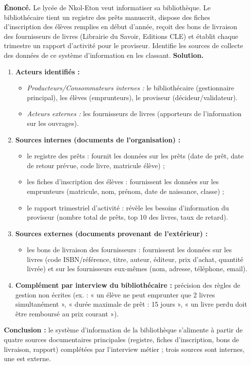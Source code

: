 \documentclass[11pt]{article}
\newcommand{\cle}[1]{{\popxbold\color{popdark}#1}}
\begin{document}
\begin{exoresolu}
\textbf{Énoncé.} Le lycée de Nkol-Eton veut informatiser sa bibliothèque. Le bibliothécaire tient un registre des prêts manuscrit, dispose des fiches d'inscription des élèves remplies en début d'année, reçoit des bons de livraison des fournisseurs de livres (Librairie du Savoir, Editions CLE) et établit chaque trimestre un rapport d'activité pour le proviseur. Identifie les sources de collecte des données de ce système d'information en les classant.
\tcblower
\textbf{Solution.}
\begin{enumerate}
  \item \textbf{Acteurs identifiés :}
  \begin{itemize}
    \item \emph{Producteurs/Consommateurs internes :} le bibliothécaire (gestionnaire principal), les élèves (emprunteurs), le proviseur (décideur/validateur).
    \item \emph{Acteurs externes :} les fournisseurs de livres (apporteurs de l'information sur les ouvrages).
  \end{itemize}
  \item \textbf{Sources internes (documents de l'organisation) :}
  \begin{itemize}
    \item le \cle{registre des prêts} : fournit les données sur les prêts (date de prêt, date de retour prévue, code livre, matricule élève) ;
    \item les \cle{fiches d'inscription des élèves} : fournissent les données sur les emprunteurs (matricule, nom, prénom, date de naissance, classe) ;
    \item le \cle{rapport trimestriel d'activité} : révèle les besoins d'information du proviseur (nombre total de prêts, top 10 des livres, taux de retard).
  \end{itemize}
  \item \textbf{Sources externes (documents provenant de l'extérieur) :}
  \begin{itemize}
    \item les \cle{bons de livraison des fournisseurs} : fournissent les données sur les livres (code ISBN/référence, titre, auteur, éditeur, prix d'achat, quantité livrée) et sur les fournisseurs eux-mêmes (nom, adresse, téléphone, email).
  \end{itemize}
  \item \textbf{Complément par interview du bibliothécaire :} précision des règles de gestion non écrites (ex. : « un élève ne peut emprunter que 2 livres simultanément », « durée maximale de prêt : 15 jours », « un livre perdu doit être remboursé au prix courant »).
\end{enumerate}
\textbf{Conclusion :} le système d'information de la bibliothèque s'alimente à partir de quatre sources documentaires principales (registre, fiches d'inscription, bons de livraison, rapport) complétées par l'interview métier ; trois sources sont internes, une est externe.
\end{exoresolu}
\end{document}

